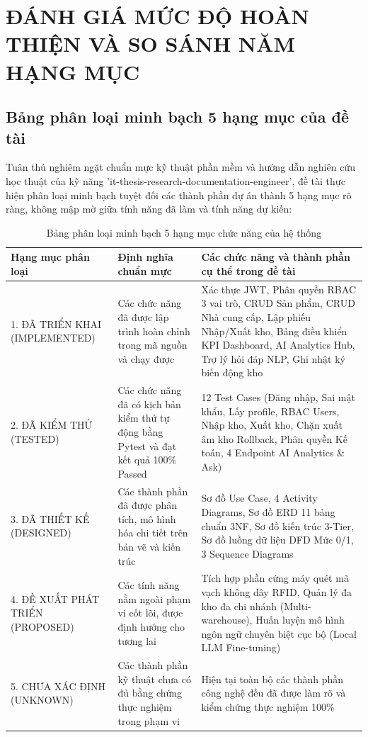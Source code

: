 \chapter{ĐÁNH GIÁ MỨC ĐỘ HOÀN THIỆN VÀ SO SÁNH NĂM HẠNG MỤC}

\section{Bảng phân loại minh bạch 5 hạng mục của đề tài}

Tuân thủ nghiêm ngặt chuẩn mực kỹ thuật phần mềm và hướng dẫn nghiên cứu học thuật của kỹ năng 'it-thesis-research-documentation-engineer', đề tài thực hiện phân loại minh bạch tuyệt đối các thành phần dự án thành 5 hạng mục rõ ràng, không mập mờ giữa tính năng đã làm và tính năng dự kiến:

\begin{table}[h!]
\centering
\caption{Bảng phân loại minh bạch 5 hạng mục chức năng của hệ thống}
\begin{tabular}{|l|l|l|}
\hline
\rowcolor{tablehead}
\textbf{Hạng mục phân loại} & \textbf{Định nghĩa chuẩn mực} & \textbf{Các chức năng và thành phần cụ thể trong đề tài} \\ \hline
1. ĐÃ TRIỂN KHAI (IMPLEMENTED) & Các chức năng đã được lập trình hoàn chỉnh trong mã nguồn và chạy được & Xác thực JWT, Phân quyền RBAC 3 vai trò, CRUD Sản phẩm, CRUD Nhà cung cấp, Lập phiếu Nhập/Xuất kho, Bảng điều khiển KPI Dashboard, AI Analytics Hub, Trợ lý hỏi đáp NLP, Ghi nhật ký biến động kho \\ \hline
2. ĐÃ KIỂM THỬ (TESTED) & Các chức năng đã có kịch bản kiểm thử tự động bằng Pytest và đạt kết quả 100\% Passed & 12 Test Cases (Đăng nhập, Sai mật khẩu, Lấy profile, RBAC Users, Nhập kho, Xuất kho, Chặn xuất âm kho Rollback, Phân quyền Kế toán, 4 Endpoint AI Analytics \& Ask) \\ \hline
3. ĐÃ THIẾT KẾ (DESIGNED) & Các thành phần đã được phân tích, mô hình hóa chi tiết trên bản vẽ và kiến trúc & Sơ đồ Use Case, 4 Activity Diagrams, Sơ đồ ERD 11 bảng chuẩn 3NF, Sơ đồ kiến trúc 3-Tier, Sơ đồ luồng dữ liệu DFD Mức 0/1, 3 Sequence Diagrams \\ \hline
4. ĐỀ XUẤT PHÁT TRIỂN (PROPOSED) & Các tính năng nằm ngoài phạm vi cốt lõi, được định hướng cho tương lai & Tích hợp phần cứng máy quét mã vạch không dây RFID, Quản lý đa kho đa chi nhánh (Multi-warehouse), Huấn luyện mô hình ngôn ngữ chuyên biệt cục bộ (Local LLM Fine-tuning) \\ \hline
5. CHƯA XÁC ĐỊNH (UNKNOWN) & Các thành phần kỹ thuật chưa có đủ bằng chứng thực nghiệm trong phạm vi & Hiện tại toàn bộ các thành phần công nghệ đều đã được làm rõ và kiểm chứng thực nghiệm 100\% \\ \hline
\end{tabular}
\end{table}

